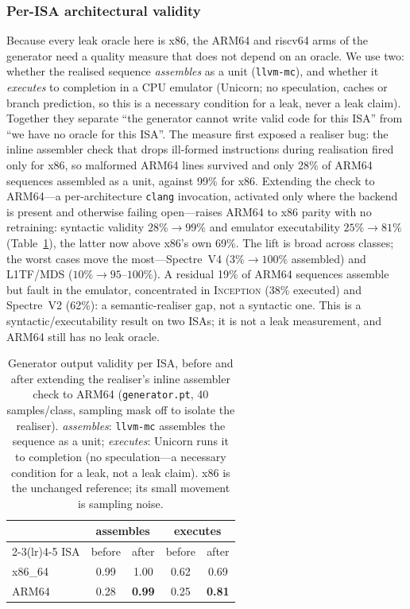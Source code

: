 \documentclass[conference]{IEEEtran}
\newcommand{\cls}[1]{\textsc{#1}}
\begin{document}
\subsubsection{Per-ISA architectural validity}
\label{sec:perisa}
Because every leak oracle here is x86, the ARM64 and riscv64 arms of the
generator need a quality measure that does not depend on an oracle. We use two:
whether the realised sequence \emph{assembles} as a unit (\texttt{llvm-mc}), and
whether it \emph{executes} to completion in a CPU emulator (Unicorn; no
speculation, caches or branch prediction, so this is a necessary condition for a
leak, never a leak claim). Together they separate ``the generator cannot write
valid code for this ISA'' from ``we have no oracle for this ISA''. The measure
first exposed a realiser bug: the inline assembler check that drops ill-formed
instructions during realisation fired only for x86, so malformed ARM64 lines
survived and only 28\% of ARM64 sequences assembled as a unit, against 99\% for
x86. Extending the check to ARM64---a per-architecture \texttt{clang}
invocation, activated only where the backend is present and otherwise failing
open---raises ARM64 to x86 parity with no retraining: syntactic validity
$28\%\!\to\!99\%$ and emulator executability $25\%\!\to\!81\%$
(Table~\ref{tab:isavalidity}), the latter now above x86's own 69\%. The lift is
broad across classes; the worst cases move the most---Spectre~V4
($3\%\!\to\!100\%$ assembled) and L1TF/MDS ($10\%\!\to\!95$--$100\%$). A residual
19\% of ARM64 sequences assemble but fault in the emulator, concentrated in
\cls{Inception} (38\% executed) and Spectre~V2 (62\%): a semantic-realiser gap,
not a syntactic one. This is a syntactic/executability result on two ISAs; it is
not a leak measurement, and ARM64 still has no leak oracle.

\begin{table}[t]
\centering
\caption{Generator output validity per ISA, before and after extending the
realiser's inline assembler check to ARM64 (\texttt{generator.pt}, 40
samples/class, sampling mask off to isolate the realiser). \emph{assembles}:
\texttt{llvm-mc} assembles the sequence as a unit; \emph{executes}: Unicorn runs
it to completion (no speculation---a necessary condition for a leak, not a leak
claim). x86 is the unchanged reference; its small movement is sampling noise.}
\label{tab:isavalidity}
\begin{tabular}{lcccc}
\toprule
 & \multicolumn{2}{c}{assembles} & \multicolumn{2}{c}{executes} \\
\cmidrule(lr){2-3}\cmidrule(lr){4-5}
ISA & before & after & before & after \\
\midrule
x86\_64 & 0.99 & 1.00 & 0.62 & 0.69 \\
ARM64 & 0.28 & \textbf{0.99} & 0.25 & \textbf{0.81} \\
\bottomrule
\end{tabular}
\end{table}
\end{document}
